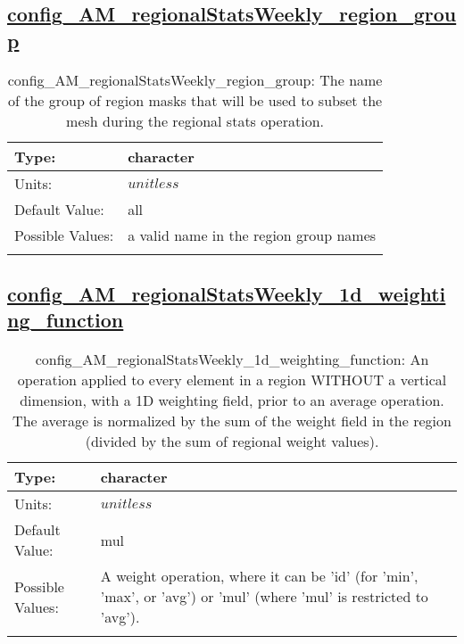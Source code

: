\subsection[config\_AM\_regionalStatsWeekly\_region\_group]{\hyperref[sec:nm_tab_AM_regionalStatsWeekly]{config\_AM\_regionalStatsWeekly\_region\_group}}
\label{subsec:nm_sec_config_AM_regionalStatsWeekly_region_group}
\begin{center}
\begin{longtable}{| p{2.0in} || p{4.0in} |}
    \hline
    Type: & character \\
    \hline
    Units: & $unitless$ \\
    \hline
    Default Value: & all \\
    \hline
    Possible Values: & a valid name in the region group names \\
    \hline
    \caption{config\_AM\_regionalStatsWeekly\_region\_group: The name of the group of region masks that will be used to subset the mesh during the regional stats operation.}
\end{longtable}
\end{center}
\subsection[config\_AM\_regionalStatsWeekly\_1d\_weighting\_function]{\hyperref[sec:nm_tab_AM_regionalStatsWeekly]{config\_AM\_regionalStatsWeekly\_1d\_weighting\_function}}
\label{subsec:nm_sec_config_AM_regionalStatsWeekly_1d_weighting_function}
\begin{center}
\begin{longtable}{| p{2.0in} || p{4.0in} |}
    \hline
    Type: & character \\
    \hline
    Units: & $unitless$ \\
    \hline
    Default Value: & mul \\
    \hline
    Possible Values: & A weight operation, where it can be 'id' (for 'min', 'max', or 'avg') or 'mul' (where 'mul' is restricted to 'avg'). \\
    \hline
    \caption{config\_AM\_regionalStatsWeekly\_1d\_weighting\_function: An operation applied to every element in a region WITHOUT a vertical dimension, with a 1D weighting field, prior to an average operation. The average is normalized by the sum of the weight field in the region (divided by the sum of regional weight values).}
\end{longtable}
\end{center}
